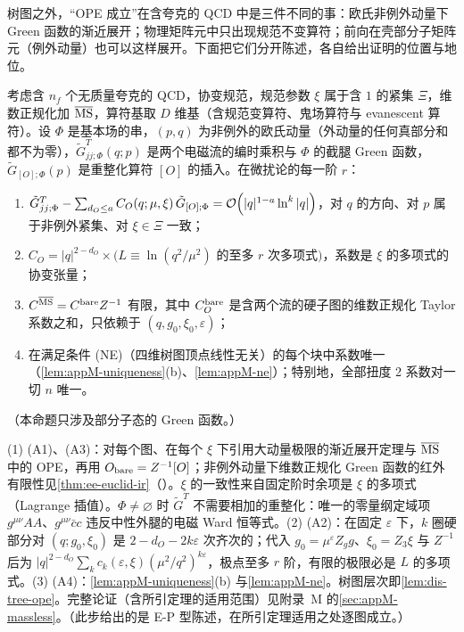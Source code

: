 树图之外，“OPE 成立”在含夸克的 QCD 中是三件不同的事：欧氏非例外动量下 Green 函数的渐近展开；物理矩阵元中只出现规范不变算符；前向在壳部分子矩阵元（例外动量）也可以这样展开。下面把它们分开陈述，各自给出证明的位置与地位。

\begin{proposition}\label{prop:dis-ope-euclid}
考虑含 $n_f$ 个无质量夸克的 QCD，协变规范，规范参数 $\xi$ 属于含 $1$ 的紧集 $\Xi$，维数正规化加 $\overline{\rm MS}$，算符基取 $D$ 维基（含规范变算符、鬼场算符与 evanescent 算符）。设 $\Phi$ 是基本场的串，$(p,q)$ 为非例外的欧氏动量（外动量的任何真部分和都不为零），$\tilde G^T_{jj;\Phi}(q;p)$ 是两个电磁流的编时乘积与 $\Phi$ 的截腿 Green 函数，$\tilde G_{[O];\Phi}(p)$ 是重整化算符 $[O]$ 的插入。在微扰论的每一阶 $r$：
\begin{enumerate}[label=(A\arabic*),leftmargin=2.6em,itemsep=0pt,topsep=2pt]
\item $\tilde G^T_{jj;\Phi}-\sum_{d_O\le a}C_O(q;\mu,\xi)\,\tilde G_{[O];\Phi}=\mathcal{O}\!\left(|q|^{1-a}\ln^k|q|\right)$，对 $q$ 的方向、对 $p$ 属于非例外紧集、对 $\xi\in\Xi$ 一致；
\item $C_O=|q|^{2-d_O}\times\big(L\equiv\ln(q^2/\mu^2)$ 的至多 $r$ 次多项式$\big)$，系数是 $\xi$ 的多项式的协变张量；
\item $C^{\overline{\rm MS}}=C^{\rm bare}Z^{-1}$ 有限，其中 $C^{\rm bare}_O$ 是含两个流的硬子图的维数正规化 Taylor 系数之和，只依赖于 $(q,g_0,\xi_0,\varepsilon)$；
\item 在满足条件 (NE)（四维树图顶点线性无关）的每个块中系数唯一（\cref{lem:appM-uniqueness}(b)、\cref{lem:appM-ne}）；特别地，全部扭度 2 系数对一切 $n$ 唯一。
\end{enumerate}
（本命题只涉及部分子态的 Green 函数。）
\end{proposition}

\begin{proofsketch}
(1) (A1)、(A3)：对每个图、在每个 $\xi$ 下引用大动量极限的渐近展开定理\cite{Smirnov:1990rz,Smirnov2002}与 $\overline{\rm MS}$ 中的 OPE\cite{Chetyrkin:1982zq}，再用 $O_{\rm bare}=Z^{-1}[O]$；非例外动量下维数正规化 Green 函数的红外有限性见\cref{thm:ee-euclid-ir}（\cite[定理~1]{Breitenlohner:1976te}）。$\xi$ 的一致性来自固定阶时余项是 $\xi$ 的多项式（Lagrange 插值）。$\Phi\ne\varnothing$ 时 $\tilde G^T$ 不需要相加的重整化：唯一的零量纲定域项 $g^{\mu\nu}AA$、$g^{\mu\nu}\bar cc$ 违反中性外腿的电磁 Ward 恒等式。(2) (A2)：在固定 $\varepsilon$ 下，$k$ 圈硬部分对 $(q;g_0,\xi_0)$ 是 $2-d_O-2k\varepsilon$ 次齐次的；代入 $g_0=\mu^\varepsilon Z_gg$、$\xi_0=Z_3\xi$ 与 $Z^{-1}$ 后为 $|q|^{2-d_O}\sum_kc_k(\varepsilon,\xi)(\mu^2/q^2)^{k\varepsilon}$，极点至多 $r$ 阶，有限的极限必是 $L$ 的多项式。(3) (A4)：\cref{lem:appM-uniqueness}(b) 与\cref{lem:appM-ne}。树图层次即\cref{lem:dis-tree-ope}。完整论证（含所引定理的适用范围）见附录~M 的\cref{sec:appM-massless}。（此步给出的是 E-P 型陈述，在所引定理适用之处逐图成立。）
\end{proofsketch}

